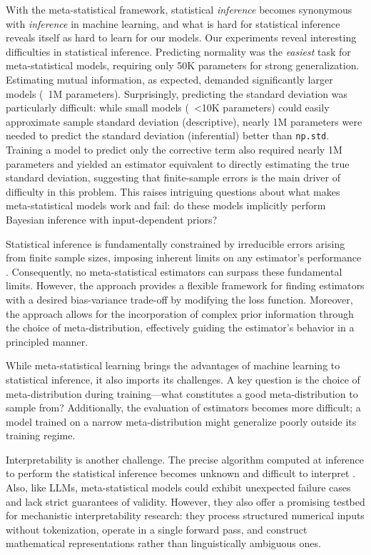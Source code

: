 With the meta-statistical framework, statistical \textit{inference} becomes synonymous with \textit{inference} in machine learning, and what is hard for statistical inference reveals itself as hard to learn for our models. Our experiments reveal interesting difficulties in statistical inference. Predicting normality was the \textit{easiest} task for meta-statistical models, requiring only 50K parameters for strong generalization. Estimating mutual information, as expected, demanded significantly larger models (~1M parameters). Surprisingly, predicting the standard deviation was particularly difficult: while small models (~<10K parameters) could easily approximate sample standard deviation (descriptive), nearly 1M parameters were needed to predict the standard deviation (inferential) better than \texttt{np.std}. Training a model to predict only the corrective term also required nearly 1M parameters and yielded an estimator equivalent to directly estimating the true standard deviation, suggesting that finite-sample errors is the main driver of difficulty in this problem. This raises intriguing questions about what makes meta-statistical models work and fail: do these models implicitly perform Bayesian inference with input-dependent priors? 

Statistical inference is fundamentally constrained by irreducible errors arising from finite sample sizes, imposing inherent limits on any estimator's performance \cite{casella2024statistical}. Consequently, no meta-statistical estimators can surpass these fundamental limits. However, the approach provides a flexible framework for finding estimators with a desired bias-variance trade-off by modifying the loss function. Moreover, the approach allows for the incorporation of complex prior information through the choice of meta-distribution, effectively guiding the estimator’s behavior in a principled manner.

While meta-statistical learning brings the advantages of machine learning to statistical inference, it also imports its challenges. A key question is the choice of meta-distribution during training—what constitutes a good meta-distribution to sample from? Additionally, the evaluation of estimators becomes more difficult; a model trained on a narrow meta-distribution might generalize poorly outside its training regime.

Interpretability is another challenge. The precise algorithm computed at inference to perform the statistical inference becomes unknown and difficult to interpret \cite{molnar2022,electronics8080832,teney2022predicting}. Also, like LLMs, meta-statistical models could exhibit unexpected failure cases and lack strict guarantees of validity. However, they also offer a promising testbed for mechanistic interpretability \cite{olah2020zoom} research: they process structured numerical inputs without tokenization, operate in a single forward pass, and construct mathematical representations rather than linguistically ambiguous ones.

